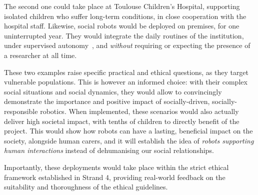 The second one could take place at Toulouse Children's Hospital, supporting
isolated children who suffer long-term conditions, in close cooperation with the
hospital staff. Likewise, social robots would be deployed on premises, for one
uninterrupted year. They would integrate the daily routines of the institution,
under supervised autonomy~\parencite{senft2017supervised}, and \emph{without}
requiring or expecting the presence of a researcher at all time.

These two examples raise specific practical and ethical questions, as they
target vulnerable populations. This is however an informed choice: with their
complex social situations and social dynamics, they would allow to convincingly
demonstrate the importance and positive impact of socially-driven,
socially-responsible robotics.  When implemented, these scenarios would also
actually deliver high societal impact, with tenths of children to directly
benefit of the project. This would show how robots can have a lasting,
beneficial impact on the society, alongside human carers, and it will establish
the idea of \emph{robots supporting human interactions} instead of dehumanising
our social relationships.

Importantly, these deployments would take place within the strict ethical framework
established in Strand 4, providing real-world feedback on the suitability and
thoroughness of the ethical guidelines.


